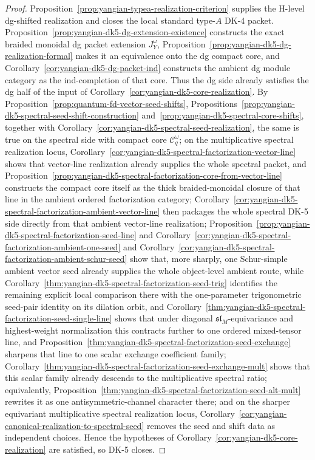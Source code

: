 \begin{proof}
Proposition~\ref{prop:yangian-typea-realization-criterion} supplies the
H-level dg-shifted realization and closes the local standard type-$A$
DK-4 packet. Proposition~\ref{prop:yangian-dk5-dg-extension-existence}
constructs the exact braided monoidal dg packet extension
\(J_Y^\omega\), Proposition~\ref{prop:yangian-dk5-dg-realization-formal}
makes it an equivalence onto the dg compact core, and
Corollary~\ref{cor:yangian-dk5-dg-packet-ind} constructs the ambient dg
module category as the ind-completion of that core. Thus the dg side
already satisfies the dg half of the input of
Corollary~\ref{cor:yangian-dk5-core-realization}. By
Proposition~\ref{prop:quantum-fd-vector-seed-shifts},
Propositions~\ref{prop:yangian-dk5-spectral-seed-shift-construction}
and~\ref{prop:yangian-dk5-spectral-core-shifts}, together with
Corollary~\ref{cor:yangian-dk5-spectral-seed-realization}, the same is
true on the spectral side with compact core \(\mathcal{C}_q^\omega\);
on the multiplicative spectral realization locus,
Corollary~\ref{cor:yangian-dk5-spectral-factorization-vector-line}
shows that vector-line realization already supplies the whole spectral
packet, and
Proposition~\ref{prop:yangian-dk5-spectral-factorization-core-from-vector-line}
constructs the compact core itself as the thick braided-monoidal
closure of that line in the ambient ordered factorization category;
Corollary~\ref{cor:yangian-dk5-spectral-factorization-ambient-vector-line}
then packages the whole spectral DK-5 side directly from that ambient
vector-line realization;
Proposition~\ref{prop:yangian-dk5-spectral-factorization-seed-line}
and
Corollary~\ref{cor:yangian-dk5-spectral-factorization-ambient-one-seed}
and
Corollary~\ref{cor:yangian-dk5-spectral-factorization-ambient-schur-seed}
show that, more sharply, one Schur-simple ambient vector seed already
supplies the whole object-level ambient route, while
Corollary~\ref{thm:yangian-dk5-spectral-factorization-seed-trig}
identifies the remaining explicit local comparison there with the
one-parameter trigonometric seed-pair identity on its dilation orbit,
and Corollary~\ref{thm:yangian-dk5-spectral-factorization-seed-single-line}
shows that under diagonal \(\mathfrak{sl}_M\)-equivariance and
highest-weight normalization this contracts further to one ordered
mixed-tensor line, and
Proposition~\ref{thm:yangian-dk5-spectral-factorization-seed-exchange}
sharpens that line to one scalar exchange coefficient family;
Corollary~\ref{thm:yangian-dk5-spectral-factorization-seed-exchange-mult}
shows that this scalar family already descends to the multiplicative
spectral ratio; equivalently,
Proposition~\ref{thm:yangian-dk5-spectral-factorization-seed-alt-mult}
rewrites it as one antisymmetric-channel character there;
and on the sharper equivariant multiplicative spectral
realization locus,
Corollary~\ref{cor:yangian-canonical-realization-to-spectral-seed}
removes the seed and shift data as independent choices.
Hence the hypotheses of
Corollary~\ref{cor:yangian-dk5-core-realization} are satisfied, so
DK-5 closes.
\end{proof}
\fi

